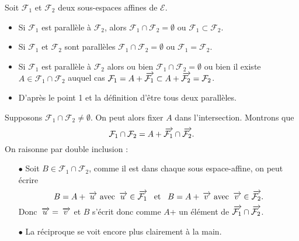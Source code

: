 \documentclass{magnolia}
\begin{document}

\begin{proposition}
Soit $\mathcal{F}_1$ et $\mathcal{F}_2$ deux sous-espaces affines de
$\mathcal{E}$.
\begin{itemize}
\item Si $\mathcal{F}_1$ est parallèle à $\mathcal{F}_2$, alors
  $\mathcal{F}_1\cap\mathcal{F}_2=\emptyset$ ou
  $\mathcal{F}_1\subset\mathcal{F}_2$.
\item Si $\mathcal{F}_1$ et $\mathcal{F}_2$ sont parallèles
  $\mathcal{F}_1\cap\mathcal{F}_2=\emptyset$ ou 
  $\mathcal{F}_1=\mathcal{F}_2$.
\end{itemize}
\end{proposition}

\begin{preuve}
\begin{itemize}
\item Si $\mathcal{F}_1$ est parallèle à $\mathcal{F}_2$ alors ou bien 
  $\mathcal{F}_1\cap\mathcal{F}_2=\emptyset$ ou bien il existe $A \in \mathcal{F}_1\cap\mathcal{F}_2$ auquel cas $\mathcal{F}_1=A+\kern 2pt\overrightarrow{\kern -2pt\mathcal{F}_1} \subset A+\kern 2pt\overrightarrow{\kern -2pt\mathcal{F}_2}=\mathcal{F}_2$.
\item D'après le point 1 et la définition d'être tous deux parallèles.
\end{itemize}
\end{preuve}


\begin{preuve}
Supposons $\mathcal{F}_1\cap\mathcal{F}_2\neq \emptyset$. On peut alors fixer $A$ dans l'intersection. Montrons que $$\mathcal{F}_1\cap\mathcal{F}_2=A+\kern 2pt\overrightarrow{\kern -2pt\mathcal{F}_1}\cap\kern 2pt\overrightarrow{\kern -2pt\mathcal{F}_2}.$$
On raisonne par double inclusion :
\begin{itemize}
\item[$\bullet$] Soit $B\in \mathcal{F}_1\cap\mathcal{F}_2$, comme il est dans chaque sous espace-affine, on peut écrire $$B=A+\kern 2pt\overrightarrow{\kern -2ptu} \text{ avec } \kern 2pt\overrightarrow{\kern -2ptu} \in \kern 2pt\overrightarrow{\kern -2pt\mathcal{F}_1} \quad\!\text{et}\quad\! B=A+\kern 2pt\overrightarrow{\kern -2ptv} \text{ avec } \kern 2pt\overrightarrow{\kern -2ptv} \in \kern 2pt\overrightarrow{\kern -2pt\mathcal{F}_2}.$$
Donc $\kern 2pt\overrightarrow{\kern -2ptu}=\kern 2pt\overrightarrow{\kern -2ptv}$ et $B$ s'écrit donc comme $A$+ un élément de $\kern 2pt\overrightarrow{\kern -2pt\mathcal{F}_1}\cap\kern 2pt\overrightarrow{\kern -2pt\mathcal{F}_2}$.
\item[$\bullet$] La réciproque se voit encore plus clairement à la main.
\end{itemize}
\end{preuve}
\end{document}
